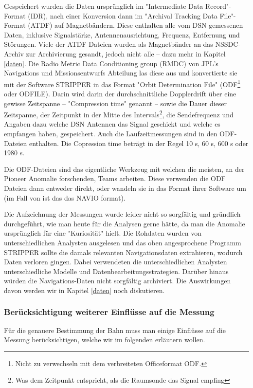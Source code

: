 Gespeichert wurden die Daten ursprünglich im "Intermediate Data Record"-Format (IDR), nach einer Konversion dann im "Archival Tracking Data File"-Format (ATDF) auf Magnetbändern. Diese enthalten alle vom DSN gemessenen Daten, inklusive Signalstärke, Antennenausrichtung, Frequenz, Entfernung und Störungen.\cite{Turyshev2010} %
Viele der ATDF Dateien wurden als Magnetbänder an das NSSDC-Archiv zur Archivierung gesandt, jedoch nicht alle – dazu mehr in Kapitel \ref{daten}.\cite{Markwardt2002}
Die Radio Metric Data Conditioning group (RMDC) von JPL's Navigations und Missionsentwurfs Abteilung las diese aus und konvertierte sie mit der Software STRIPPER in das Format "Orbit Determination File" (ODF\footnote{Nicht zu verwechseln mit dem verbreiteten Officeformat ODF.} oder ODFILE).
Darin wird darin der durchschnittliche Dopplerdrift über eine gewisse Zeitspanne
– "Compression time" genannt – sowie die Dauer dieser Zeitspanne, der Zeitpunkt in der Mitte des Intervals\footnote{Was dem Zeitpunkt entspricht, als die Raumsonde das Signal empfing\cite{Levy2008}}, die Sendefrequenz und
Angaben dazu welche DSN Antennen das Signal geschickt und welche es empfangen haben, gespeichert.\cite{Levy2008}
Auch die Laufzeitmessungen sind in den ODF-Dateien enthalten.\cite{Anderson2002}
Die Copression time beträgt in der Regel 10 s, 60 s, 600 s oder 1980 s.\cite{Anderson2002} %

Die ODF-Dateien sind das eigentliche Werkzeug mit welchen die meisten, an der Pioneer Anomalie forschenden, Teams arbeiten. Diese verwenden die ODF Dateien dann entweder direkt, oder wandeln sie in das Format ihrer Software um (im Fall von \cite{Anderson2002} ist das das NAVIO format).

Die Aufzeichnung der Messungen wurde leider nicht so sorgfältig und gründ\-lich durchgeführt, wie man heute für die Analysen gerne hätte, da man die Anomalie ursprünglich für eine "Kuriosität" hielt.\cite{Nieto2005}
Die Rohdaten wurden von unterschiedlichen Analysten ausgelesen und das oben angesprochene Programm STRIPPER sollte die damals relevanten Navigationsdaten extrahieren\cite{Nieto2005}, wodurch Daten verloren gingen. %
Dabei verwendeten die unterschiedlichen Analysten unterschiedliche Modelle und Datenbearbeitungsstrategien.\cite{Nieto2005}
Darüber hinaus würden die Navigations-Daten nicht sorgfältig archiviert.\cite{Nieto2005}
Die Auswirkungen davon werden wir in Kapitel \ref{daten} noch diskutieren.


\subsubsection{Berücksichtigung weiterer Einflüsse auf die Messung}
Für die genauere Bestimmung der Bahn muss man einige Einflüsse auf die Messung berücksichtigen, welche wir im folgenden erläutern wollen.

